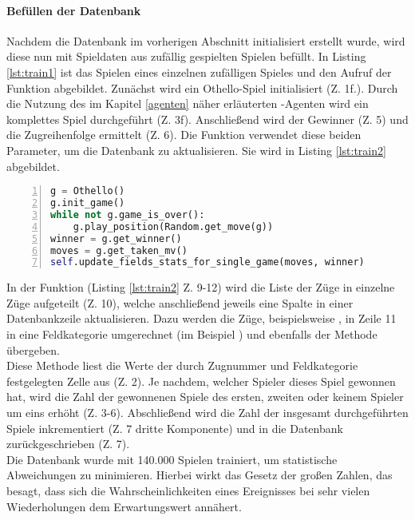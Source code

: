 \paragraph{Befüllen der Datenbank}
\label{para:train1}
Nachdem die Datenbank im vorherigen Abschnitt initialisiert erstellt wurde, wird diese nun mit Spieldaten aus zufällig gespielten Spielen befüllt. In Listing \ref{lst:train1} ist das Spielen eines einzelnen zufälligen Spieles und den Aufruf der Funktion  abgebildet. Zunächst wird ein Othello-Spiel initialisiert (Z. 1f.). Durch die Nutzung des im Kapitel \ref{agenten} näher erläuterten -Agenten wird ein komplettes Spiel durchgeführt (Z. 3f). Anschließend wird der Gewinner (Z. 5) und die Zugreihenfolge ermittelt (Z. 6). Die Funktion  verwendet diese beiden Parameter, um die Datenbank zu aktualisieren. Sie wird in Listing \ref{lst:train2} abgebildet.
\newpage
\begin{lstlisting}[basicstyle=\footnotesize, caption = {Befüllen der Datenbank 1}, language = python, captionpos = t , numbers=left, label={lst:train1}]
g = Othello()
g.init_game()
while not g.game_is_over():
	g.play_position(Random.get_move(g))
winner = g.get_winner()
moves = g.get_taken_mv()
self.update_fields_stats_for_single_game(moves, winner)
\end{lstlisting}
In der Funktion  (Listing \ref{lst:train2} Z. 9-12) wird die Liste der Züge in einzelne Züge aufgeteilt (Z. 10), welche anschließend jeweils eine Spalte in einer Datenbankzeile aktualisieren. Dazu werden die Züge, beispielsweise , in Zeile 11 in eine Feldkategorie umgerechnet (im Beispiel ) und ebenfalls der Methode  übergeben.
\\Diese Methode liest die Werte der durch Zugnummer und Feldkategorie festgelegten Zelle aus (Z. 2). Je nachdem, welcher Spieler dieses Spiel gewonnen hat, wird die Zahl der gewonnenen Spiele des ersten, zweiten oder keinem Spieler um eins erhöht (Z. 3-6). Abschließend wird die Zahl der insgesamt durchgeführten Spiele inkrementiert (Z. 7 dritte Komponente) und in die Datenbank zurückgeschrieben (Z. 7).
\\Die Datenbank wurde mit 140.000 Spielen trainiert, um statistische Abweichungen zu minimieren. Hierbei wirkt das Gesetz der großen Zahlen, das besagt, dass sich die Wahrscheinlichkeiten eines Ereignisses bei sehr vielen Wiederholungen dem Erwartungswert annähert.
